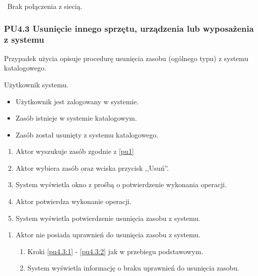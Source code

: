 \
Brak połączenia z siecią.

\subsubsection{PU4.3 Usunięcie innego sprzętu, urządzenia lub wyposażenia z systemu}

Przypadek użycia opisuje procedurę usunięcia zasobu (ogólnego typu) z systemu katalogowego.

Użytkownik systemu.

\begin{itemize}
\item Użytkownik jest zalogowany w systemie.
\item Zasób istnieje w systemie katalogowym.
\end{itemize}

\begin{itemize}
\item Zasób został usunięty z systemu katalogowego.
\end{itemize}

\begin{enumerate}
\item \label{pu4.3:1} Aktor wyszukuje zasób zgodnie z \ref{pu1}
\item \label{pu4.3:2} Aktor wybiera zasób oraz wciska przycisk ,,Usuń''.
\item System wyświetla okno z prośbą o potwierdzenie wykonania operacji.
\item Aktor potwierdza wykonanie operacji.
\item System wyświetla potwierdzenie usunięcia zasobu z systemu.
\end{enumerate}

\begin{enumerate}
\item Aktor nie posiada uprawnień do usunięcia zasobu z systemu.
	\begin{enumerate}[label*=\arabic*.]
		\item Kroki \ref{pu4.3:1} - \ref{pu4.3:2} jak w przebiegu podstawowym.
		\item System wyświetla informację o braku uprawnień do usunięcia zasobu.
	\end{enumerate}
\end{enumerate}

